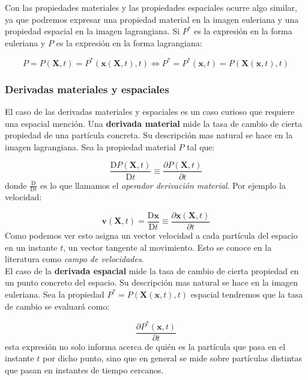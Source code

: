 \documentclass[12pt,a4paper]{article}
\numberwithin{equation}{section}
\numberwithin{figure}{section}
\newcommand{\parciales}[2]{\frac{\partial #1}{\partial #2}}
\newcommand{\Dd}{\mathrm{D}}
\newcommand{\vn}{\mathbf{v}}
\newcommand{\xn}{\mathbf{x}}
\newcommand{\Xn}{\mathbf{X}}
\begin{document}
Con las propiedades materiales y las propiedades espaciales ocurre algo similar, ya que podremos expresar una propiedad material en la imagen euleriana y una propiedad espacial en la imagen lagrangiana. Si $P^*$ es la expresión en la forma euleriana y $P$ es la expresión en la forma lagrangiana:


\begin{equation}
P = P (\Xn,t) = P^*(\xn(\Xn,t),t) \Longleftrightarrow P^* = P^* (\xn,t) = P(\Xn(\xn,t),t)
\end{equation}


\subsubsection{Derivadas materiales y espaciales}

El caso de las derivadas materiales y espaciales es un caso curioso que requiere una espacial mención. Una \textbf{derivada material} mide la tasa de cambio de cierta propiedad de una partícula concreta. Su descripción mas natural se hace en la imagen lagrangiana. Sea la propiedad material $P$ tal que:

\begin{equation}
\dfrac{\Dd P(\Xn,t)}{\Dd t} \equiv \parciales{P(\Xn,t)}{t}
\end{equation}
donde $\frac{\Dd }{ \Dd t}$ es lo que llamamos el \textit{operador derivación material}. Por ejemplo la velocidad:

\begin{equation}
\vn (\Xn,t) =  \dfrac{\Dd \xn}{\Dd t} \equiv \parciales{\xn(\Xn,t)}{t}
\end{equation} Como podemos ver esto asigna un vector velocidad a cada partícula del espacio en un instante $t$, un vector tangente al movimiento. Esto se conoce en la literatura como \textit{campo de velocidades}.  \\

El caso de la \textbf{derivada espacial} mide la tasa de cambio de cierta propiedad en un punto concreto del espacio. Su descripción mas natural se hace en la imagen euleriana. Sea la propiedad $P^*=P(\Xn(\xn,t),t)$ espacial tendremos que la tasa de cambio se evaluará como:

$$ \parciales{P^*(\xn,t)}{t}$$
esta expresión no solo informa acerca de quién es la partícula que pasa en el instante $t$ por dicho punto, sino que en general se mide sobre partículas distintas que pasan en instantes de tiempo cercanos. \\
\end{document}
